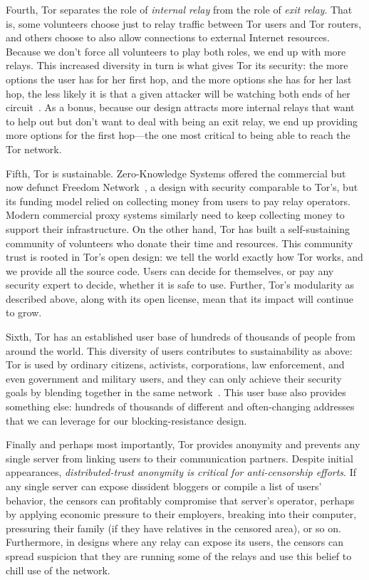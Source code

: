 \documentclass{llncs}
\begin{document}
Fourth, Tor separates the role of \emph{internal relay} from the
role of \emph{exit relay}. That is, some volunteers choose just to relay
traffic between Tor users and Tor routers, and others choose to also allow
connections to external Internet resources. Because we don't force all
volunteers to play both roles, we end up with more relays. This increased
diversity in turn is what gives Tor its security: the more options the
user has for her first hop, and the more options she has for her last hop,
the less likely it is that a given attacker will be watching both ends
of her circuit~\cite{tor-design}. As a bonus, because our design attracts
more internal relays that want to help out but don't want to deal with
being an exit relay, we end up providing more options for the first
hop---the one most critical to being able to reach the Tor network.

Fifth, Tor is sustainable. Zero-Knowledge Systems offered the commercial
but now defunct Freedom Network~\cite{freedom21-security}, a design with
security comparable to Tor's, but its funding model relied on collecting
money from users to pay relay operators. Modern commercial proxy systems
similarly
need to keep collecting money to support their infrastructure. On the
other hand, Tor has built a self-sustaining community of volunteers who
donate their time and resources. This community trust is rooted in Tor's
open design: we tell the world exactly how Tor works, and we provide all
the source code. Users can decide for themselves, or pay any security
expert to decide, whether it is safe to use. Further, Tor's modularity
as described above, along with its open license, mean that its impact
will continue to grow.

Sixth, Tor has an established user base of hundreds of
thousands of people from around the world. This diversity of
users contributes to sustainability as above: Tor is used by
ordinary citizens, activists, corporations, law enforcement, and
even government and military users,
and they can
only achieve their security goals by blending together in the same
network~\cite{econymics,usability:weis2006}. This user base also provides
something else: hundreds of thousands of different and often-changing
addresses that we can leverage for our blocking-resistance design.

Finally and perhaps most importantly, Tor provides anonymity and prevents any
single server from linking users to their communication partners.  Despite
initial appearances, {\it distributed-trust anonymity is critical for
anti-censorship efforts}.  If any single server can expose dissident bloggers
or compile a list of users' behavior, the censors can profitably compromise
that server's operator, perhaps by  applying economic pressure to their
employers,
breaking into their computer, pressuring their family (if they have relatives
in the censored area), or so on.  Furthermore, in designs where any relay can
expose its users, the censors can spread suspicion that they are running some
of the relays and use this belief to chill use of the network.
\end{document}
